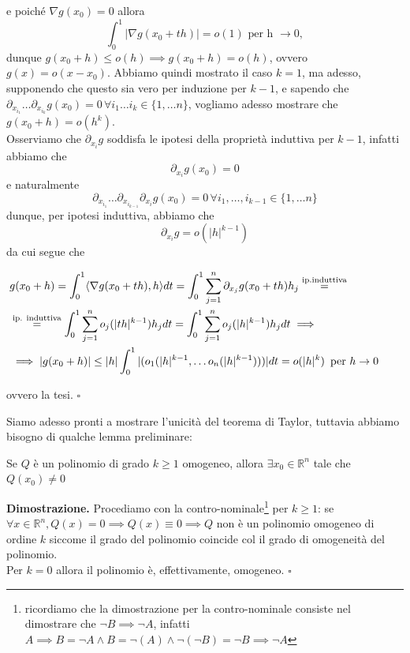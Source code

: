 e poiché $\nabla g(x_0) = 0$ allora
$$
\int_0^1 |\nabla g(x_0 + th)| = o(1) \, \, \text{per h } \to 0,
$$
dunque $g(x_0 + h) \leq o(h) \implies g(x_0 + h) = o(h)$, ovvero $g(x)=o(x-x_0)$. Abbiamo quindi mostrato il caso $k=1$, ma adesso, supponendo che questo sia vero per induzione per $k-1$, e sapendo che $\partial_{x_{i_1}} \ldots \partial_{x_{i_k}} g(x_0) = 0 \, \forall i_1 \ldots i_k \in \{1, \ldots n \}$, vogliamo adesso mostrare che $g(x_0 + h) = o(h^{k})$. \\
Osserviamo che $\partial_{x_i} g$ soddisfa le ipotesi della proprietà induttiva per $k-1$, infatti abbiamo che
$$
\partial_{x_i} g(x_0) = 0
$$
e naturalmente
$$
\partial_{x_{i_1}} \ldots \partial_{x_{i_{k-1}}} \partial_{x_i} g(x_0) = 0 \, \forall i_1, \ldots, i_{k-1} \in \{1, \ldots n\}
$$
dunque, per ipotesi induttiva, abbiamo che
$$
\partial_{x_i} g = o(|h|^{k-1})
$$
da cui segue che

\[\begin{aligned}
&g(x_0 + h) = \int_0^1 \langle \nabla g(x_0 + th), h \rangle dt = \int_0^1 \sum_{j=1}^n \partial_{x_j} g(x_0 + th)h_j \stackrel{\text{ip.induttiva}}{=} \\
&\stackrel{\text{ip. induttiva}}{=} \int_0^1 \sum_{j=1}^n o_j(|th|^{k-1})h_j dt = \int_0^1 \sum_{j=1}^n o_j(|h|^{k-1})h_j dt \implies & & \\
&\implies |g(x_0+h)| \leq |h| \int_0^1 |(o_1(|h|^{k-1}, \ldots o_n(|h|^{k-1})))|dt = o(|h|^k) \, \text{ per } h \to 0 & &
\end{aligned}\]

ovvero la tesi.
\hfill $\square$

\vspace{0.5cm}
Siamo adesso pronti a mostrare l'unicità del teorema di Taylor, tuttavia abbiamo bisogno di qualche lemma preliminare:

\begin{lemma}
Se $Q$ è un polinomio di grado $k \geq 1$ omogeneo, allora $\exists x_0 \in \mathbb{R}^n$ tale che $Q(x_0) \neq 0$ 
\end{lemma}

\noindent \textbf{Dimostrazione. }
Procediamo con la contro-nominale\footnote{ricordiamo che la dimostrazione per la contro-nominale consiste nel dimostrare che $\neg B \implies \neg A$, infatti $A \implies B = \neg A \wedge B = \neg{(A)} \wedge \neg(\neg B) = \neg B \implies \neg A$} per $k \geq 1$: se $\forall x \in \mathbb{R}^n, Q(x) = 0 \implies Q(x) \equiv 0 \implies Q$ non è un polinomio omogeneo di ordine $k$ siccome il grado del polinomio coincide col il grado di omogeneità del polinomio. \\
Per $k=0$ allora il polinomio è, effettivamente, omogeneo.
\hfill $\square$

